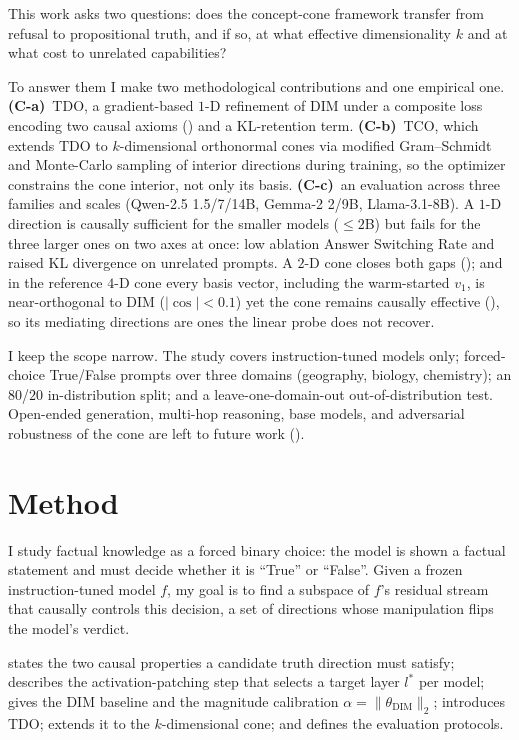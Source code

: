 \documentclass[sn-basic]{sn-jnl}
\newcommand{\dimv}{\theta_{\text{DIM}}}
\begin{document}
This work asks two questions: does the concept-cone framework transfer from
refusal to propositional truth, and if so, at what effective dimensionality $k$
and at what cost to unrelated capabilities?

To answer them I make two methodological contributions and one empirical one.
\textbf{(C-a)}~TDO, a gradient-based $1$-D refinement of DIM under a composite
loss encoding two causal axioms () and a KL-retention term.
\textbf{(C-b)}~TCO, which extends TDO to $k$-dimensional orthonormal cones via
modified Gram--Schmidt and Monte-Carlo sampling of interior directions during
training, so the optimizer constrains the cone interior, not only its basis.
\textbf{(C-c)}~an evaluation across three families and scales (Qwen-2.5
1.5/7/14B, Gemma-2 2/9B, Llama-3.1-8B). A $1$-D direction is causally sufficient
for the smaller models ($\le 2$B) but fails for the three larger ones on two
axes at once: low ablation Answer Switching Rate and raised KL divergence on
unrelated prompts. A $2$-D cone closes both gaps (); and in the
reference $4$-D cone every basis vector, including the warm-started $v_1$,
is near-orthogonal to DIM ($|\cos| < 0.1$) yet the cone remains causally
effective (), so its mediating directions are ones the
linear probe does not recover.

I keep the scope narrow. The study covers instruction-tuned models only;
forced-choice True/False prompts over three domains (geography, biology,
chemistry); an $80$/$20$ in-distribution split; and a leave-one-domain-out
out-of-distribution test. Open-ended generation, multi-hop reasoning, base
models, and adversarial robustness of the cone are left to future work
().


\section{Method}
\label{sec:method}

% 
I study factual knowledge as a forced binary choice: the model is shown a
factual statement and must decide whether it is ``True'' or ``False''. Given a
frozen instruction-tuned model $f$, my goal is to find a subspace of $f$'s
residual stream that causally controls this decision, a set of directions
whose manipulation flips the model's verdict.

 states the two causal properties a candidate truth direction
must satisfy;  describes the activation-patching step that selects
a target layer $l^{*}$ per model;  gives the DIM baseline and the
magnitude calibration $\alpha = \|\dimv\|_2$;  introduces TDO;
 extends it to the $k$-dimensional cone; and 
defines the evaluation protocols.
\end{document}
